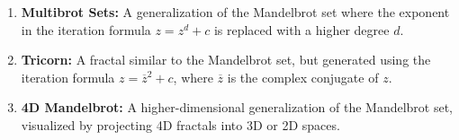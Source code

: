\documentclass[preview]{standalone}
\begin{document}
\begin{center}
\begin{enumerate}\item \textbf{Multibrot Sets:} A generalization of the Mandelbrot set where the exponent in the iteration formula $z = z^d + c$ is replaced with a higher degree $d$.\item \textbf{Tricorn:} A fractal similar to the Mandelbrot set, but generated using the iteration formula $z = \overline{z}^2 + c$, where $\overline{z}$ is the complex conjugate of $z$.\item \textbf{4D Mandelbrot:} A higher-dimensional generalization of the Mandelbrot set, visualized by projecting 4D fractals into 3D or 2D spaces.\end{enumerate}
\end{center}
\end{document}
